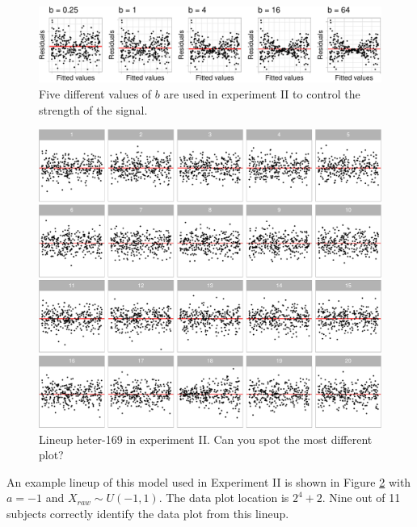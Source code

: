 \documentclass[]{interact}
\theoremstyle{plain}%
\theoremstyle{definition}
\theoremstyle{remark}
\begin{document}
\begin{figure}

{\centering \includegraphics[width=1\linewidth]{paper_comparison_files/figure-latex/different-b-1} 

}

\caption{Five different values of $b$ are used in experiment II to control the strength of the signal.}\label{fig:different-b}
\end{figure}

\begin{figure}

{\centering \includegraphics[width=1\linewidth]{paper_comparison_files/figure-latex/example-heter-lineup-1} 

}

\caption{Lineup heter-169 in experiment II. Can you spot the most different plot? \label{fig:example-heter-lineup}}\label{fig:example-heter-lineup}
\end{figure}

An example lineup of this model used in Experiment II is shown in Figure
\ref{fig:example-heter-lineup} with \(a = -1\) and
\(X_{raw} \sim U(-1, 1)\). The data plot location is \(2^4 + 2\). Nine
out of 11 subjects correctly identify the data plot from this lineup.
\end{document}
